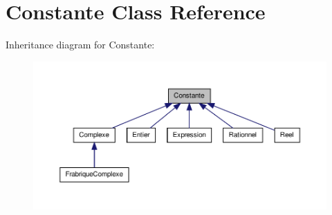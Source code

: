 \hypertarget{class_constante}{\section{\-Constante \-Class \-Reference}
\label{class_constante}
}


\-Inheritance diagram for \-Constante\-:
\nopagebreak
\begin{figure}[H]
\begin{center}
\leavevmode
\includegraphics[width=350pt]{class_constante__inherit__graph}
\end{center}
\end{figure}
